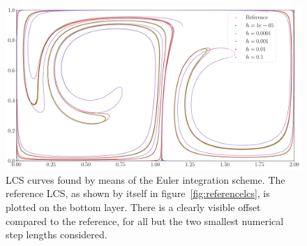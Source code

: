 \begin{figure}[htpb]
    \centering
    \includegraphics[width=0.8\linewidth]{figures/lcs_figures/euler.pdf}
    \caption[LCS curves found by means of the Euler integration scheme]{
        LCS curves found by means of the Euler integration scheme. The
        reference LCS, as shown by itself in figure~\ref{fig:referencelcs},
        is plotted on the bottom layer. There is a clearly visible offset
        compared to the reference, for all but the two smallest numerical step
        lengths considered.}
    \label{fig:lcs_euler}
\end{figure}
